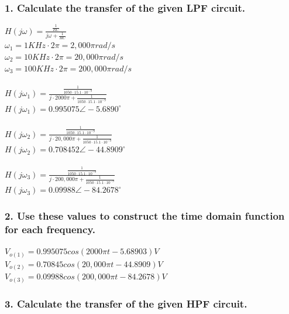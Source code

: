 \documentclass[11pt]{article}
\begin{document}
	\subsubsection*{1. Calculate the transfer of the given LPF circuit.}
	
	$H(j\omega)=\frac{\frac{1}{RC}}{j\omega+\frac{1}{RC}}$\\
	$\omega_{1}=1KHz\cdot 2\pi=2,000\pi rad/s$\\
	$\omega_{2}=10KHz\cdot 2\pi=20,000\pi rad/s$\\
	$\omega_{3}=100KHz\cdot 2\pi=200,000\pi rad/s$\\\\
	$H(j\omega_{1})=\frac{\frac{1}{1050\cdot 15.1 \cdot 10^{-9}}}{j\cdot 2000\pi+\frac{1}{1050\cdot 15.1 \cdot 10^{-9}}}$\\
	$H(j\omega_{1})=0.995075 \angle-5.6890^{\circ} $\\\\
	$H(j\omega_{2})=\frac{\frac{1}{1050\cdot 15.1 \cdot 10^{-9}}}{j\cdot 20,000\pi+\frac{1}{1050\cdot 15.1 \cdot 10^{-9}}}$\\
	$H(j\omega_{2})=0.708452 \angle-44.8909^{\circ} $\\	\\
	$H(j\omega_{3})=\frac{\frac{1}{1050\cdot 15.1 \cdot 10^{-9}}}{j\cdot 200,000\pi+\frac{1}{1050\cdot 15.1 \cdot 10^{-9}}}$\\
	$H(j\omega_{3})=0.09988 \angle-84.2678^{\circ} $\\
	
	\subsubsection*{2. Use these values to construct the time domain function for each frequency.}
	
	$V_{o(1)}=0.995075cos(2000\pi t-5.68903)V$\\
	$V_{o(2)}=0.70845cos(20,000\pi t-44.8909)V$\\
	$V_{o(3)}=0.09988cos(200,000\pi t-84.2678)V$\\
	
	\subsubsection*{3. Calculate the transfer of the given HPF circuit.}
	
\end{document}
